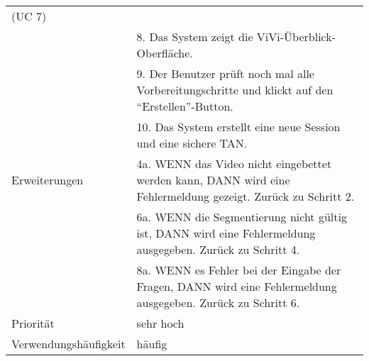 \begin{tabularx}{\linewidth}{|l|X|}
							  (UC 7) \\
							& 8. Das System zeigt die ViVi-Überblick-Oberfläche. \\ 
							& 9. Der Benutzer prüft noch mal alle Vorbereitungschritte und 
							  klickt auf den ``Erstellen''-Button. \\
							& 10. Das System erstellt eine neue Session und eine sichere TAN. \\ 
							  \hline
	Erweiterungen			& 4a. WENN das Video nicht eingebettet werden kann, DANN wird eine 
	                          Fehlermeldung gezeigt. Zurück zu Schritt 2. \\
							& 6a. WENN die Segmentierung nicht gültig ist, DANN wird eine 
							  Fehlermeldung ausgegeben. Zurück zu Schritt 4.\\
							& 8a. WENN es Fehler bei der Eingabe der Fragen, DANN wird 
							  eine Fehlermeldung ausgegeben. Zurück zu Schritt 6. \\ \hline
	Priorität				& sehr hoch \\ \hline
	Verwendungshäufigkeit	& häufig \\ \hline
\end{tabularx}